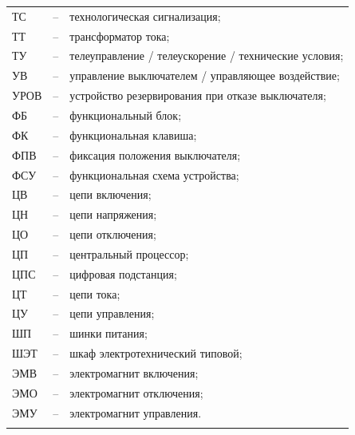 \begin{longtable}{>{\raggedright\arraybackslash}m{2cm}>{\raggedright\arraybackslash}m{0.5cm}>{\raggedright\arraybackslash}m{20cm}}
ТС & -- & технологическая сигнализация; \\
ТТ & -- & трансформатор тока; \\
ТУ & -- & телеуправление / телеускорение / технические условия; \\
УВ & -- & управление выключателем / управляющее воздействие; \\
УРОВ & -- & устройство резервирования при отказе выключателя; \\
ФБ & -- & функциональный блок; \\
ФК & -- & функциональная клавиша; \\
ФПВ & -- & фиксация положения выключателя; \\
ФСУ & -- & функциональная схема устройства; \\
ЦВ & -- & цепи включения; \\
ЦН & -- & цепи напряжения; \\
ЦО & -- & цепи отключения; \\
ЦП & -- & центральный процессор; \\
ЦПС & -- & цифровая подстанция; \\
ЦТ & -- & цепи тока; \\
ЦУ & -- & цепи управления; \\
ШП & -- & шинки питания; \\
ШЭТ & -- & шкаф электротехнический типовой; \\
ЭМВ & -- & электромагнит включения; \\
ЭМО & -- & электромагнит отключения; \\
ЭМУ & -- & электромагнит управления. \\
{\color{white}\fontsize{0.1pt}{0.1pt}\selectfont<endABBRS>}
\end{longtable}
